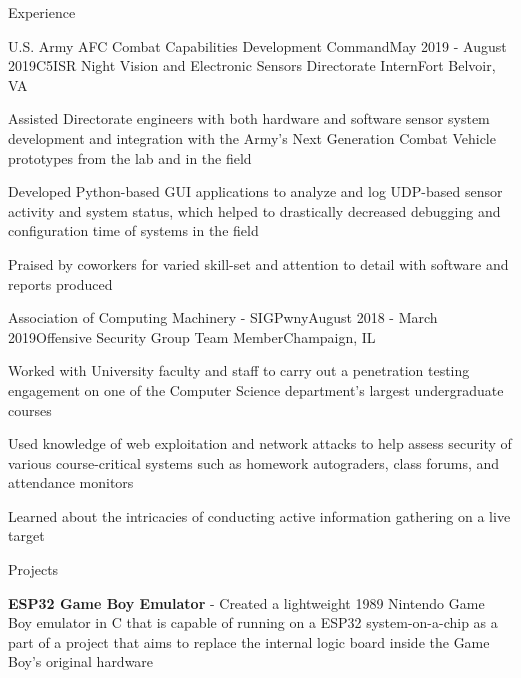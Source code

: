 \documentclass{resume} %
\begin{document}
\begin{rSection}{Experience}

\begin{rSubsection}{U.S. Army AFC Combat Capabilities Development Command}{May 2019 - August 2019}{C5ISR Night Vision and Electronic Sensors Directorate Intern}{Fort Belvoir, VA}
\item Assisted Directorate engineers with both hardware and software sensor system development and integration with the Army's Next Generation Combat Vehicle prototypes from the lab and in the field
\item Developed Python-based GUI applications to analyze and log UDP-based sensor activity and system status, which helped to drastically decreased debugging and configuration time of systems in the field
\item Praised by coworkers for varied skill-set and attention to detail with software and reports produced
\end{rSubsection}

\begin{rSubsection}{Association of Computing Machinery - SIGPwny}{August 2018 - March 2019}{Offensive Security Group Team Member}{Champaign, IL}
\item Worked with University faculty and staff to carry out a penetration testing engagement on one of the Computer Science
department's largest undergraduate courses
\item Used knowledge of web exploitation and network attacks to help assess security of various course-critical
systems such as homework autograders, class forums, and attendance monitors
\item Learned about the intricacies of conducting active information gathering on a live target
\end{rSubsection}


\end{rSection}

\begin{rSection}{Projects}

\item {\bf ESP32 Game Boy Emulator} - Created a lightweight 1989 Nintendo Game Boy emulator in C that is capable of running on a ESP32 system-on-a-chip as a part of a project that aims to replace the internal logic board inside the Game Boy's original hardware
\end{rSection}
\end{document}
